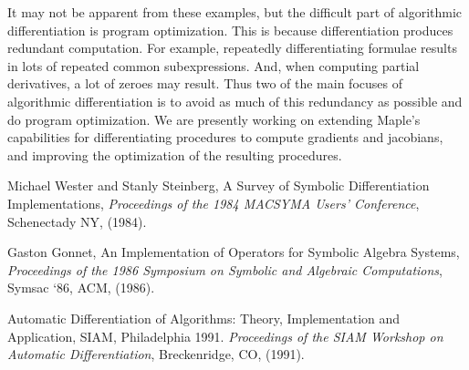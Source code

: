 \documentclass[11pt,dvips]{mtn}
\begin{document}
It may not be apparent from these examples, but the difficult
part of algorithmic differentiation is program optimization.
This is because differentiation produces redundant computation.
For example, repeatedly differentiating formulae results in
lots of repeated common subexpressions.  And, when computing partial
derivatives, a lot of zeroes may result.
Thus two of the main focuses of algorithmic differentiation is
to avoid as much of this redundancy as possible and 
do program optimization.
We are presently working on extending Maple's capabilities for
differentiating procedures to compute gradients and jacobians,
and improving the optimization of the resulting procedures.

\begin{thebibliography}{10}

Michael Wester and Stanly Steinberg,
A Survey of Symbolic Differentiation Implementations,
\emph{Proceedings of the 1984 MACSYMA Users' Conference},
Schenectady NY, (1984).

Gaston Gonnet,
An Implementation of Operators for Symbolic Algebra Systems,
\emph{Proceedings of the 1986 Symposium on Symbolic and Algebraic Computations},
Symsac `86, ACM, (1986).

Automatic Differentiation of Algorithms: Theory, Implementation
and Application, SIAM, Philadelphia 1991.
\textit{Proceedings of the SIAM Workshop on Automatic Differentiation},
Breckenridge, CO, (1991).

\end{thebibliography}
\end{document}
